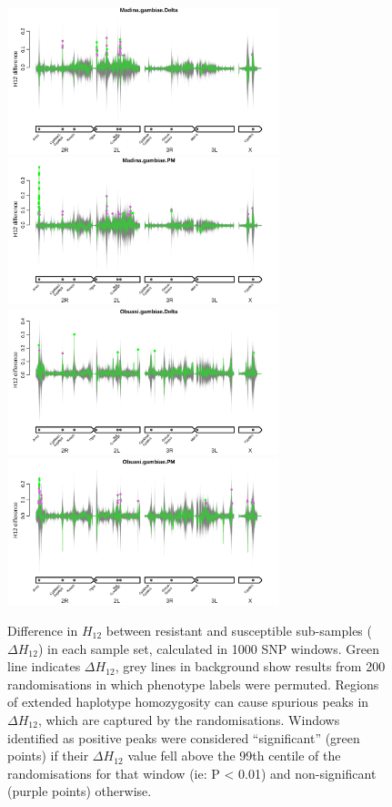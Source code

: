 \documentclass[a4paper,12pt]{article}
\begin{document}
\begin{figure}[h]
	\vskip 0.4cm
	\includegraphics*[width = 7.9cm]{../../randomisations/H12/Madina.gambiae.Delta_peak_filter_plot.png}
	\includegraphics*[width = 7.9cm]{../../randomisations/H12/Madina.gambiae.PM_peak_filter_plot.png}
	\vskip 0.4cm
	\includegraphics*[width = 7.9cm]{../../randomisations/H12/Obuasi.gambiae.Delta_peak_filter_plot.png}
	\includegraphics*[width = 7.9cm]{../../randomisations/H12/Obuasi.gambiae.PM_peak_filter_plot.png}
	\caption{\footnotesize Difference in $H_{12}$ between resistant and susceptible sub-samples ($\Delta H_{12}$) in each sample set, calculated in 1000 SNP windows. Green line indicates $\Delta H_{12}$, grey lines in background show results from 200 randomisations in which phenotype labels were permuted. Regions of extended haplotype homozygosity can cause spurious peaks in $\Delta H_{12}$, which are captured by the randomisations. Windows identified as positive peaks were considered ``significant'' (green points) if their $\Delta H_{12}$ value fell above the 99th centile of the randomisations for that window (ie: P < 0.01) and non-significant (purple points) otherwise.}
	\label{FigS6}
\end{figure}
\end{document}

